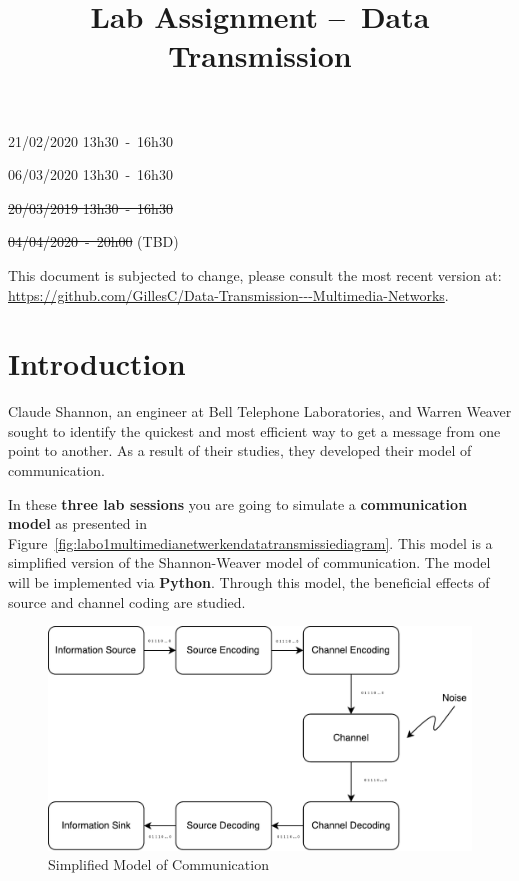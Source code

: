\documentclass[12pt,a4paper]{article}
\title{Lab Assignment --\ Data Transmission\\\vspace{0.5cm}{\Large Multimedia Networks}}
\author{\authorName}
\newcommand{\dateSessionOne}{21/02/2020 13h30\ -\ 16h30}
\newcommand{\dateSessionTwo}{06/03/2020 13h30\ -\ 16h30}
\newcommand{\dateSessionThree}{\st{20/03/2019 13h30\ -\ 16h30}}
\newcommand{\softDeadline}{\st{04/04/2020\ -\ 20h00} (TBD)}
\begin{document}
\maketitle
\vfill


\begin{center}

  \begin{minipage}{0.65\linewidth}
\begin{description}[style=multiline, leftmargin=4cm]
	\item[Lab session 1] \dateSessionOne
	\item[Lab session 2] \dateSessionTwo
	\item[Lab session 3] \dateSessionThree
\end{description}
\vfill
\begin{description}[style=multiline, leftmargin=4cm]
	\item[Deadline] \softDeadline
\end{description}
\vfill
{\footnotesize
This document is subjected to change, please consult the most recent version at: \url{https://github.com/GillesC/Data-Transmission---Multimedia-Networks}.
}
\end{minipage}
\end{center}

\vfill
\clearpage


\section{Introduction}
Claude Shannon, an engineer at Bell Telephone Laboratories, and Warren Weaver sought to identify the quickest and most efficient way to get a message from one point to another. As a result of their studies, they developed their model of communication.

In these \textbf{three lab sessions} you are going to simulate a \textbf{communication model} as presented in Figure~\vref{fig:labo1multimedianetwerkendatatransmissiediagram}. This model is a simplified version of the Shannon-Weaver model of communication. The model will be implemented via \textbf{Python}. Through this model, the beneficial effects of source and channel coding are studied. 

\begin{figure}[h]
	\centering
	\includegraphics[width=0.7\linewidth]{labo_1_multimedianetwerken_datatransmissie_diagram.pdf}
	\caption{Simplified Model of Communication}\label{fig:labo1multimedianetwerkendatatransmissiediagram}
\end{figure}
\end{document}
